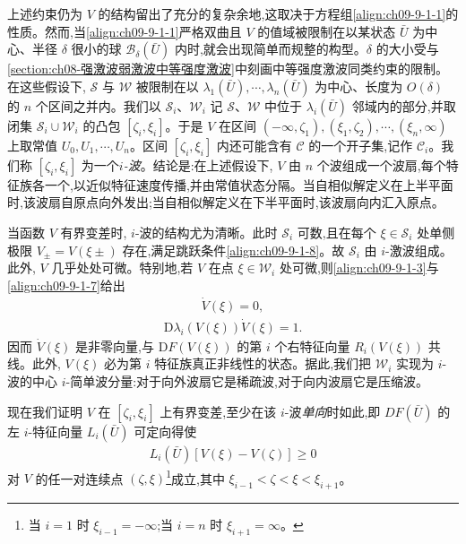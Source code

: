 \documentclass[../../main.tex]{subfiles}
\begin{document}
上述约束仍为 $V$ 的结构留出了充分的复杂余地,这取决于方程组\eqref{align:ch09-9-1-1}的性质。然而,当\eqref{align:ch09-9-1-1}严格双曲且 $V$ 的值域被限制在以某状态 $\bar{U}$ 为中心、半径 $\delta$ 很小的球 $\mathscr{B}_{\delta}(\bar{U})$ 内时,就会出现简单而规整的构型。$\delta$ 的大小受与\cref{section:ch08-强激波弱激波中等强度激波}中刻画中等强度激波同类约束的限制。在这些假设下, $\mathscr{S}$ 与 $\mathscr{W}$ 被限制在以 $\lambda_{1}(\bar{U}),\cdots ,\lambda_{n}(\bar{U})$ 为中心、长度为 $O(\delta)$ 的 $n$ 个区间之并内。我们以 $\mathscr{S}_{i}$、$\mathscr{W}_{i}$ 记 $\mathscr{S}$、$\mathscr{W}$ 中位于 $\lambda_{i}(\bar{U})$ 邻域内的部分,并取闭集 $\mathscr{S}_{i}\cup\mathscr{W}_{i}$ 的凸包 $[\zeta_{i},\xi_{i}]$。于是 $V$ 在区间 $(-\infty,\zeta_{1}),(\xi_{1},\zeta_{2}),\cdots ,(\xi_{n},\infty)$ 上取常值 $U_{0},U_{1},\cdots ,U_{n}$。区间 $[\zeta_{i},\xi_{i}]$ 内还可能含有 $\mathscr{C}$ 的一个开子集,记作 $\mathscr{C}_{i}$。我们称 $[\zeta_{i},\xi_{i}]$ 为一个\emph{$i$-波}。结论是:在上述假设下, $V$ 由 $n$ 个波组成一个波扇,每个特征族各一个,以近似特征速度传播,并由常值状态分隔。当自相似解定义在上半平面时,该波扇自原点向外发出;当自相似解定义在下半平面时,该波扇向内汇入原点。

当函数 $V$ 有界变差时, $i$-波的结构尤为清晰。此时 $\mathscr{S}_{i}$ 可数,且在每个 $\xi\in\mathscr{S}_{i}$ 处单侧极限 $V_{\pm}=V(\xi\pm)$ 存在,满足跳跃条件\eqref{align:ch09-9-1-8}。故 $\mathscr{S}_{i}$ 由 $i$-激波组成。此外, $V$ 几乎处处可微。特别地,若 $V$ 在点 $\xi\in\mathscr{W}_{i}$ 处可微,则\eqref{align:ch09-9-1-3}与\eqref{align:ch09-9-1-7}给出
\begin{align}
[\mathrm{D}F(V(\xi))-\xi I]\dot{V}(\xi)=0,
\label{align:ch09-9-1-11}
\end{align}
\begin{align}
\mathrm{D}\lambda_{i}(V(\xi))\dot{V}(\xi)=1.
\label{align:ch09-9-1-12}
\end{align}
因而 $\dot{V}(\xi)$ 是非零向量,与 $\mathrm{D}F(V(\xi))$ 的第 $i$ 个右特征向量 $R_{i}(V(\xi))$ 共线。此外, $V(\xi)$ 必为第 $i$ 特征族真正非线性的状态。据此,我们把 $\mathscr{W}_{i}$ 实现为 $i$-波的中心 $i$-简单波分量:对于向外波扇它是稀疏波,对于向内波扇它是压缩波。

现在我们证明 $V$ 在 $[\zeta_{i},\xi_{i}]$ 上有界变差,至少在该 $i$-波\emph{单向}时如此,即 $DF(\bar{U})$ 的左 $i$-特征向量 $L_{i}(\bar{U})$ 可定向得使
\begin{align}
L_{i}(\bar{U})[V(\xi)-V(\zeta)]\geqslant 0
\label{align:ch09-9-1-13}
\end{align}
对 $V$ 的任一对连续点 $(\zeta,\xi)$\footnote{当 $i=1$ 时 $\xi_{i-1}=-\infty$;当 $i=n$ 时 $\xi_{i+1}=\infty$。}成立,其中 $\xi_{i-1}<\zeta<\xi<\xi_{i+1}$。
\end{document}
